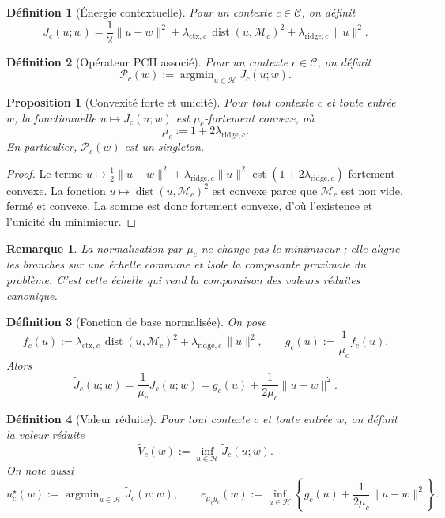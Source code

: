 \documentclass[11pt,a4paper]{article}
\newtheorem{definition}{Définition}[section]
\newtheorem{proposition}{Proposition}[section]
\newtheorem{remark}{Remarque}[section]
\DeclareMathOperator{\argmin}{argmin}
\DeclareMathOperator{\dist}{dist}
\newcommand{\Hh}{\mathcal H}
\newcommand{\Mcal}{\mathcal M}
\newcommand{\Ccal}{\mathcal C}
\newcommand{\Pcal}{\mathcal P}
\begin{document}
\begin{definition}[Énergie contextuelle]
Pour un contexte \(c\in\Ccal\), on définit
\[
J_c(u;w)=\frac12\|u-w\|^2+\lambda_{\mathrm{ctx},c}\,\dist(u,\Mcal_c)^2+\lambda_{\mathrm{ridge},c}\,\|u\|^2.
\]
\end{definition}

\begin{definition}[Opérateur PCH associé]
Pour un contexte \(c\in\Ccal\), on définit
\[
\Pcal_c(w):=\argmin_{u\in\Hh}J_c(u;w).
\]
\end{definition}

\begin{proposition}[Convexité forte et unicité]
Pour tout contexte \(c\) et toute entrée \(w\), la fonctionnelle \(u\mapsto J_c(u;w)\) est \(\mu_c\)-fortement convexe, où
\[
\mu_c:=1+2\lambda_{\mathrm{ridge},c}.
\]
En particulier, \(\Pcal_c(w)\) est un singleton.
\end{proposition}

\begin{proof}
Le terme \(u\mapsto \frac12\|u-w\|^2+\lambda_{\mathrm{ridge},c}\|u\|^2\) est \((1+2\lambda_{\mathrm{ridge},c})\)-fortement convexe. La fonction \(u\mapsto \dist(u,\Mcal_c)^2\) est convexe parce que \(\Mcal_c\) est non vide, fermé et convexe. La somme est donc fortement convexe, d'où l'existence et l'unicité du minimiseur.
\end{proof}

\begin{remark}
La normalisation par \(\mu_c\) ne change pas le minimiseur ; elle aligne les branches sur une échelle commune et isole la composante proximale du problème. C'est cette échelle qui rend la comparaison des valeurs réduites canonique.
\end{remark}

\begin{definition}[Fonction de base normalisée]
On pose
\[
f_c(u):=\lambda_{\mathrm{ctx},c}\,\dist(u,\Mcal_c)^2+\lambda_{\mathrm{ridge},c}\,\|u\|^2,
\qquad
g_c(u):=\frac{1}{\mu_c}f_c(u).
\]
Alors
\[
\widetilde J_c(u;w)=\frac{1}{\mu_c}J_c(u;w)=g_c(u)+\frac{1}{2\mu_c}\|u-w\|^2.
\]
\end{definition}

\begin{definition}[Valeur réduite]
Pour tout contexte \(c\) et toute entrée \(w\), on définit la valeur réduite
\[
\widetilde V_c(w):=\inf_{u\in\Hh}\widetilde J_c(u;w).
\]
On note aussi
\[
u_c^\star(w):=\argmin_{u\in\Hh}\widetilde J_c(u;w),
\qquad
e_{\mu_c g_c}(w):=\inf_{u\in\Hh}\left\{g_c(u)+\frac{1}{2\mu_c}\|u-w\|^2\right\}.
\]
\end{definition}
\end{document}
